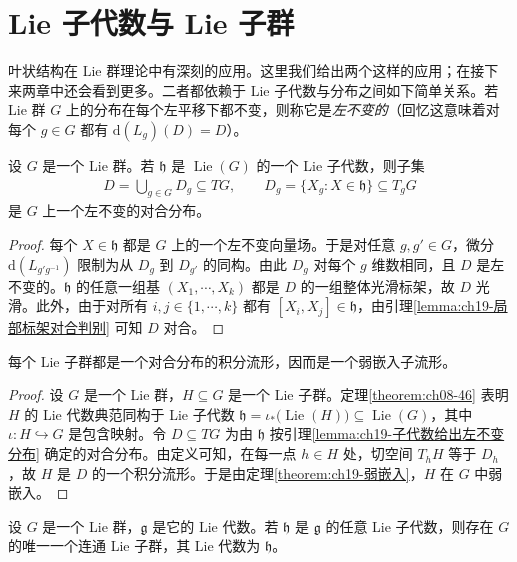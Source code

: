 \documentclass[../../main.tex]{subfiles}
\begin{document}
\section{Lie 子代数与 Lie 子群}\label{section:ch19-lie-subalgebras}

叶状结构在 Lie 群理论中有深刻的应用。这里我们给出两个这样的应用；在接下来两章中还会看到更多。二者都依赖于 Lie 子代数与分布之间如下简单关系。若 Lie 群 $G$ 上的分布在每个左平移下都不变，则称它是\emph{左不变的}（回忆这意味着对每个 $g\in G$ 都有 $\mathrm{d}(L_g)(D)=D$）。

\begin{lemma}\label{lemma:ch19-子代数给出左不变分布}
设 $G$ 是一个 Lie 群。若 $\mathfrak h$ 是 $\operatorname{Lie}(G)$ 的一个 Lie 子代数，则子集
\begin{align}
D=\bigcup_{g\in G}D_g\subseteq TG,\qquad D_g=\{X_g\colon X\in\mathfrak h\}\subseteq T_gG
\end{align}
是 $G$ 上一个左不变的对合分布。
\end{lemma}

\begin{proof}
每个 $X\in\mathfrak h$ 都是 $G$ 上的一个左不变向量场。于是对任意 $g,g'\in G$，微分 $\mathrm{d}(L_{g'g^{-1}})$ 限制为从 $D_g$ 到 $D_{g'}$ 的同构。由此 $D_g$ 对每个 $g$ 维数相同，且 $D$ 是左不变的。$\mathfrak h$ 的任意一组基 $(X_1,\cdots ,X_k)$ 都是 $D$ 的一组整体光滑标架，故 $D$ 光滑。此外，由于对所有 $i,j\in\{1,\cdots ,k\}$ 都有 $[X_i,X_j]\in\mathfrak h$，由引理\cref{lemma:ch19-局部标架对合判别} 可知 $D$ 对合。
\end{proof}

\begin{theorem}\label{theorem:ch19-子群弱嵌入}
每个 Lie 子群都是一个对合分布的积分流形，因而是一个弱嵌入子流形。
\end{theorem}

\begin{proof}
设 $G$ 是一个 Lie 群，$H\subseteq G$ 是一个 Lie 子群。定理\cref{theorem:ch08-46} 表明 $H$ 的 Lie 代数典范同构于 Lie 子代数 $\mathfrak h=\iota_*\bigl(\operatorname{Lie}(H)\bigr)\subseteq\operatorname{Lie}(G)$，其中 $\iota\colon H\hookrightarrow G$ 是包含映射。令 $D\subseteq TG$ 为由 $\mathfrak h$ 按引理\cref{lemma:ch19-子代数给出左不变分布} 确定的对合分布。由定义可知，在每一点 $h\in H$ 处，切空间 $T_hH$ 等于 $D_h$，故 $H$ 是 $D$ 的一个积分流形。于是由定理\cref{theorem:ch19-弱嵌入}，$H$ 在 $G$ 中弱嵌入。
\end{proof}

\begin{theorem}\label{theorem:ch19-子代数对应子群}
设 $G$ 是一个 Lie 群，$\mathfrak g$ 是它的 Lie 代数。若 $\mathfrak h$ 是 $\mathfrak g$ 的任意 Lie 子代数，则存在 $G$ 的唯一一个连通 Lie 子群，其 Lie 代数为 $\mathfrak h$。
\end{theorem}
\end{document}
